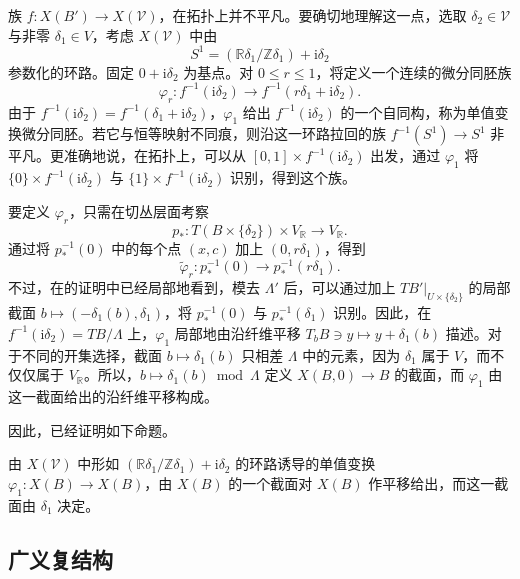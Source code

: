 族 $f\colon X(B')\to X(\mathcal V)$，在拓扑上并不平凡。要确切地理解这一点，选取 $\delta_2\in\mathcal V$ 与非零 $\delta_1\in V$，考虑 $X(\mathcal V)$ 中由
\[
S^1=(\mathbb R\delta_1/\mathbb Z\delta_1)+\mathrm i\delta_2
\]
参数化的环路。固定 $0+\mathrm i\delta_2$ 为基点。对 $0\leq r\leq1$，将定义一个连续的微分同胚族
\[
\varphi_r\colon f^{-1}(\mathrm i\delta_2)
\longrightarrow f^{-1}(r\delta_1+\mathrm i\delta_2).
\]
由于 $f^{-1}(\mathrm i\delta_2)=f^{-1}(\delta_1+\mathrm i\delta_2)$，$\varphi_1$ 给出 $f^{-1}(\mathrm i\delta_2)$ 的一个自同构，称为单值变换微分同胚。若它与恒等映射不同痕，则沿这一环路拉回的族 $f^{-1}(S^1)\to S^1$ 非平凡。更准确地说，在拓扑上，可以从 $[0,1]\times f^{-1}(\mathrm i\delta_2)$ 出发，通过 $\varphi_1$ 将 $\{0\}\times f^{-1}(\mathrm i\delta_2)$ 与 $\{1\}\times f^{-1}(\mathrm i\delta_2)$ 识别，得到这个族。

要定义 $\varphi_r$，只需在切丛层面考察
\[
p_*\colon T(B\times\{\delta_2\})\times V_{\mathbb R}
\longrightarrow V_{\mathbb R}.
\]
通过将 $p_*^{-1}(0)$ 中的每个点 $(x,c)$ 加上 $(0,r\delta_1)$，得到
\[
\widetilde\varphi_r\colon p_*^{-1}(0)\longrightarrow p_*^{-1}(r\delta_1).
\]
不过，在的证明中已经局部地看到，模去 $\Lambda'$ 后，可以通过加上 $TB'|_{U\times\{\delta_2\}}$ 的局部截面 $b\mapsto(-\delta_1(b),\delta_1)$，将 $p_*^{-1}(0)$ 与 $p_*^{-1}(\delta_1)$ 识别。因此，在 $f^{-1}(\mathrm i\delta_2)=TB/\Lambda$ 上，$\varphi_1$ 局部地由沿纤维平移 $T_bB\ni y\mapsto y+\delta_1(b)$ 描述。对于不同的开集选择，截面 $b\mapsto\delta_1(b)$ 只相差 $\Lambda$ 中的元素，因为 $\delta_1$ 属于 $V$，而不仅仅属于 $V_{\mathbb R}$。所以，$b\mapsto\delta_1(b)\bmod\Lambda$ 定义 $X(B,0)\to B$ 的截面，而 $\varphi_1$ 由这一截面给出的沿纤维平移构成。

因此，已经证明如下命题。

\begin{proposition}\label{prop:6.32}
由 $X(\mathcal V)$ 中形如 $(\mathbb R\delta_1/\mathbb Z\delta_1)+\mathrm i\delta_2$ 的环路诱导的单值变换 $\varphi_1\colon X(B)\to X(B)$，由 $X(B)$ 的一个截面对 $X(B)$ 作平移给出，而这一截面由 $\delta_1$ 决定。
\end{proposition}

\subsection{广义复结构}\label{sec:6.2.5}


